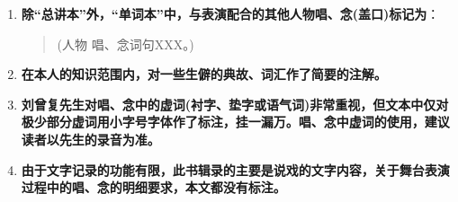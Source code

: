 {\begin{enumerate}
\begin{enumerate}
\def\labelenumi{\arabic{enumi}.}
\item
  每个剧目中凡有出入的唱、念词句标注为：

\begin{quote}
	\underline{\textrm{XX}词1}~({\akai 或}:~\textrm{XX}词2；~\textrm{XX}词3；$\cdots{}\cdots${})
\end{quote}
\begin{quote}
	\underline{\textrm{XX}句1}~({\akai 或}:~\textrm{XX}句2~{\akai 或}:~\textrm{XX}句3；$\cdots{}\cdots${})
\end{quote}

\def\labelenumi{\arabic{enumi}.}
\setcounter{enumi}{1}
\item
  每个剧目中可不念或某些衬字的唱、念标注为：

\begin{quote}
	(\textrm{XX}词句)
\end{quote}
\end{enumerate}

\def\labelenumi{\arabic{enumi}.}
\setcounter{enumi}{2}
\item
  \textbf{除``总讲本''外，``单词本''中，与表演配合的其他人物唱、念(盖口)标记为}：
\begin{quote}
	(人物\hspace{30pt} 唱、念词句\textrm{XXX}。)
\end{quote}
\item
  \textbf{在本人的知识范围内，对一些生僻的典故、词汇作了简要的注解。}
\item
  \textbf{刘曾复先生对唱、念中的虚词(衬字、垫字或语气词)非常重视，但文本中仅对极少部分虚词用小字号字体作了标注，挂一漏万。唱、念中虚词的使用，建议读者以先生的录音为准。}
\item
  \textbf{由于文字记录的功能有限，此书辑录的主要是说戏的文字内容，关于舞台表演过程中的唱、念的明细要求，本文都没有标注。}
\end{enumerate}
}
